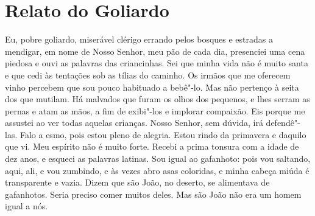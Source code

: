 \chapter{Relato do Goliardo}
Eu, pobre goliardo, miserável clérigo errando pelos bosques e estradas a
mendigar, em nome de Nosso Senhor, meu pão de cada dia, presenciei uma
cena piedosa e ouvi as palavras das criancinhas. Sei que minha vida não é
muito santa e que cedi às tentações sob as tílias do caminho. Os irmãos
que me oferecem vinho percebem que sou pouco habituado a bebê"-lo. Mas não
pertenço à seita dos que mutilam. Há malvados que furam os olhos dos
pequenos, e lhes serram as pernas e atam as mãos, a fim de exibi"-los e
implorar compaixão. Eis porque me assustei ao ver todas aquelas crianças.
Nosso Senhor, sem dúvida, irá defendê"-las. Falo a esmo, pois estou pleno
de alegria. Estou rindo da primavera e daquilo que vi. Meu espírito não é
muito forte. Recebi a prima tonsura com a idade de dez anos, e esqueci as
palavras latinas. Sou igual ao gafanhoto: pois vou saltando, aqui, ali, e
vou zumbindo, e às vezes abro asas coloridas, e minha cabeça miúda é
transparente e vazia. Dizem que são João, no deserto, se alimentava de
gafanhotos. Seria preciso comer muitos deles. Mas são João não era um
homem igual a nós.

